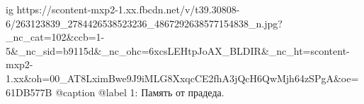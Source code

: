  
 
 
 
 

\ifcmt
  ig https://scontent-mxp2-1.xx.fbcdn.net/v/t39.30808-6/263123839_2784426538523236_4867292638577154838_n.jpg?_nc_cat=102&ccb=1-5&_nc_sid=b9115d&_nc_ohc=6xcsLEHtpJoAX_BLDIR&_nc_ht=scontent-mxp2-1.xx&oh=00_AT8LximBwe9J9iMLG8XxqcCE2fhA3jQcH6QwMjh64zSPgA&oe=61DB577B
  @caption @label 1: Память от прадеда.
\fi
